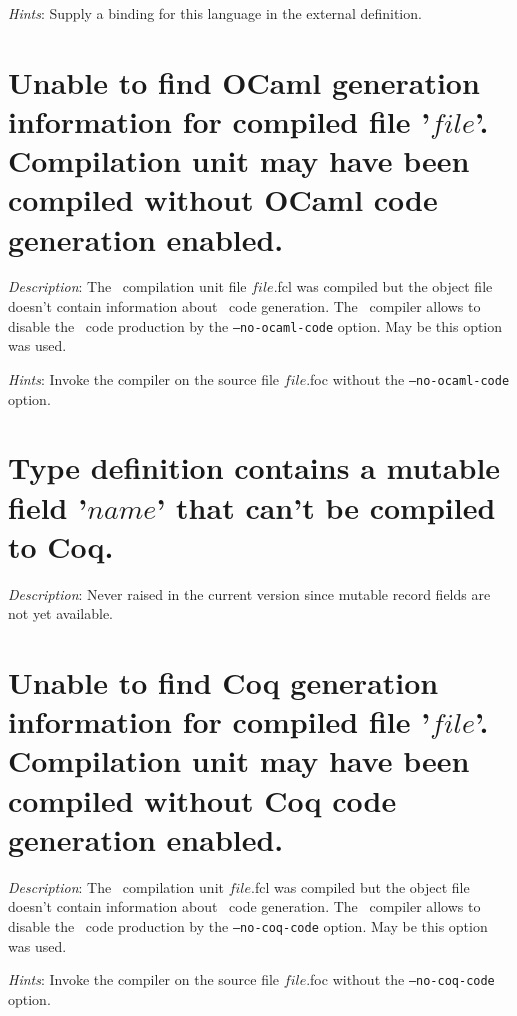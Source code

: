 {\em Hints}: Supply a binding for this language in the external
definition.



\section*{Unable to find OCaml generation information for compiled
  file '$file$'. Compilation unit may have been compiled without OCaml code
  generation enabled.}

{\em Description}: The \focal\ compilation unit file $file$.fcl was compiled but
the object file doesn't contain information about \ocaml\ code
generation. The \focal\ compiler allows to disable the \ocaml\ code
production by the {\tt --no-ocaml-code} option. May be this option was used.

{\em Hints}: Invoke the compiler on the source file $file$.foc without
the {\tt --no-ocaml-code} option.



\section*{Type definition contains a mutable field '$name$' that can't
  be compiled to Coq.}

{\em Description}: {\color{red} Never raised in the current version
  since mutable record fields are not yet available}.



\section*{Unable to find Coq generation information for compiled file
  '$file$'. Compilation unit may have been compiled without Coq code
  generation enabled.}

{\em Description}: The \focal\ compilation unit $file$.fcl was
compiled but the object file doesn't contain information about \coq\
code generation. The \focal\ compiler allows to disable the \coq\ code
production by the {\tt --no-coq-code} option. May be this option was
used.

{\em Hints}: Invoke the compiler on the source file $file$.foc without
the {\tt --no-coq-code} option.



